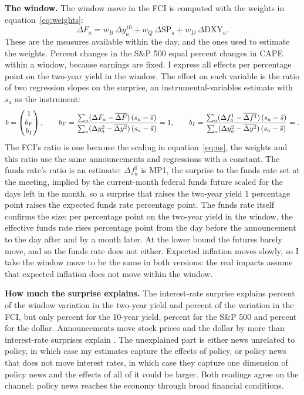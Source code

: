 \documentclass[11pt]{article}
\begin{document}
\textbf{The window.} The window move in the FCI is computed with the weights in equation~\eqref{eq:weights}:
\begin{equation}
\Delta F_a = w_B\, \Delta y^{10}_a + w_Q\, \Delta \text{SP}_a + w_D\, \Delta \text{DXY}_a. \label{eq:winfci}
\end{equation}
These are the measures available within the day, and the ones used to estimate the weights. Percent changes in the S\&P 500 equal percent changes in CAPE within a window, because earnings are fixed. I express all effects per percentage point on the two-year yield in the window. The effect on each variable is the ratio of two regression slopes on the surprise, an instrumental-variables estimate with $s_a$ as the instrument:
\begin{equation}
b = \begin{pmatrix} 1 \\ b_F \\ b_I \end{pmatrix}, \qquad b_F = \frac{\sum_a (\Delta F_a - \overline{\Delta F})\,(s_a-\bar s)}{\sum_a (\Delta y^{2}_a - \overline{\Delta y^{2}})\,(s_a-\bar s)} = 1, \qquad b_I = \frac{\sum_a (\Delta f^{1}_a - \overline{\Delta f^{1}})\,(s_a-\bar s)}{\sum_a (\Delta y^{2}_a - \overline{\Delta y^{2}})\,(s_a-\bar s)} = \bl{ff:b}. \label{eq:impact}
\end{equation}
The FCI's ratio is one because the scaling in equation~\eqref{eq:ns}, the weights and this ratio use the same announcements and regressions with a constant. The funds rate's ratio is an estimate: $\Delta f^{1}_a$ is MP1, the surprise to the funds rate set at the meeting, implied by the current-month federal funds future scaled for the days left in the month, so a surprise that raises the two-year yield 1 percentage point raises the expected funds rate  percentage point. The funds rate itself confirms the size: per percentage point on the two-year yield in the window, the effective funds rate rises  percentage point from the day before the announcement to the day after and  by a month later. At the lower bound the futures barely move, and so the funds rate does not either. Expected inflation moves slowly, so I take the window move to be the same in both versions: the real impacts assume that expected inflation does not move within the window.

\textbf{How much the surprise explains.} The interest-rate surprise explains  percent of the window variation in the two-year yield and  percent of the variation in the FCI, but only  percent for the 10-year yield,  percent for the S\&P 500 and  percent for the dollar. Announcements move stock prices and the dollar by more than interest-rate surprises explain \citep{boehm2024,bauer2026}. The unexplained part is either news unrelated to policy, in which case my estimates capture the effects of policy, or policy news that does not move interest rates, in which case they capture one dimension of policy news and the effects of all of it could be larger. Both readings agree on the channel: policy news reaches the economy through broad financial conditions.
\end{document}
